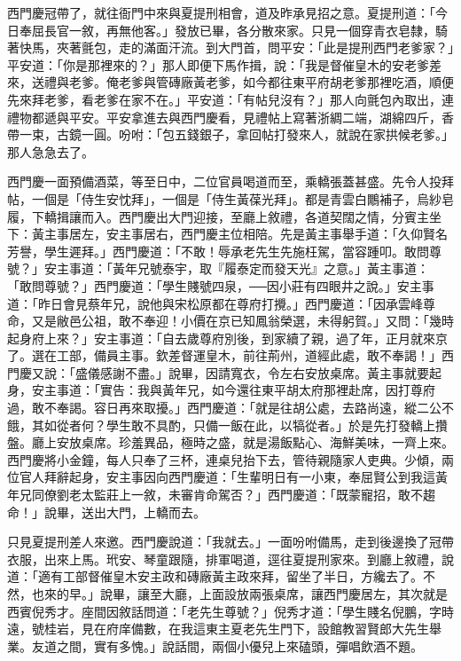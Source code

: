 西門慶冠帶了，就往衙門中來與夏提刑相會，道及昨承見招之意。夏提刑道：「今日奉屈長官一敘，再無他客。」發放已畢，各分散來家。只見一個穿青衣皂隸，騎著快馬，夾著氈包，走的滿面汗流。到大門首，問平安：「此是提刑西門老爹家？」平安道：「你是那裡來的？」那人即便下馬作揖，說：「我是督催皇木的安老爹差來，送禮與老爹。俺老爹與管磚廠黃老爹，如今都往東平府胡老爹那裡吃酒，順便先來拜老爹，看老爹在家不在。」平安道：「有帖兒沒有？」那人向氈包內取出，連禮物都遞與平安。平安拿進去與西門慶看，見禮帖上寫著浙綢二端，湖綿四斤，香帶一束，古鏡一圓。吩咐：「包五錢銀子，拿回帖打發來人，就說在家拱候老爹。」那人急急去了。

西門慶一面預備酒菜，等至日中，二位官員喝道而至，乘轎張蓋甚盛。先令人投拜帖，一個是「侍生安忱拜」，一個是「侍生黃葆光拜」。都是青雲白鷳補子，烏紗皂履，下轎揖讓而入。西門慶出大門迎接，至廳上敘禮，各道契闊之情，分賓主坐下：黃主事居左，安主事居右，西門慶主位相陪。先是黃主事舉手道：「久仰賢名芳譽，學生遲拜。」西門慶道：「不敢！辱承老先生先施枉駕，當容踵叩。敢問尊號？」安主事道：「黃年兄號泰宇，取『履泰定而發天光』之意。」黃主事道： 「敢問尊號？」西門慶道：「學生賤號四泉，──因小莊有四眼井之說。」安主事道：「昨日會見蔡年兄，說他與宋松原都在尊府打攪。」西門慶道：「因承雲峰尊命，又是敝邑公祖，敢不奉迎！小價在京已知鳳翁榮選，未得躬賀。」又問：「幾時起身府上來？」安主事道：「自去歲尊府別後，到家續了親，過了年，正月就來京了。選在工部，備員主事。欽差督運皇木，前往荊州，道經此處，敢不奉謁！」西門慶又說：「盛儀感謝不盡。」說畢，因請寬衣，令左右安放桌席。黃主事就要起身，安主事道：「實告：我與黃年兄，如今還往東平胡太府那裡赴席，因打尊府過，敢不奉謁。容日再來取擾。」西門慶道：「就是往胡公處，去路尚遠，縱二公不餓，其如從者何？學生敢不具酌，只備一飯在此，以犒從者。」於是先打發轎上攢盤。廳上安放桌席。珍羞異品，極時之盛，就是湯飯點心、海鮮美味，一齊上來。西門慶將小金鐘，每人只奉了三杯，連桌兒抬下去，管待親隨家人吏典。少傾，兩位官人拜辭起身，安主事因向西門慶道：「生輩明日有一小東，奉屈賢公到我這黃年兄同僚劉老太監莊上一敘，未審肯命駕否？」西門慶道：「既蒙寵招，敢不趨命！」說畢，送出大門，上轎而去。

只見夏提刑差人來邀。西門慶說道：「我就去。」一面吩咐備馬，走到後邊換了冠帶衣服，出來上馬。玳安、琴童跟隨，排軍喝道，逕往夏提刑家來。到廳上敘禮，說道：「適有工部督催皇木安主政和磚廠黃主政來拜，留坐了半日，方纔去了。不然，也來的早。」說畢，讓至大廳，上面設放兩張桌席，讓西門慶居左，其次就是西賓倪秀才。座間因敘話問道：「老先生尊號？」倪秀才道：「學生賤名倪鵬，字時遠，號桂岩，見在府庠備數，在我這東主夏老先生門下，設館教習賢郎大先生舉業。友道之間，實有多愧。」說話間，兩個小優兒上來磕頭，彈唱飲酒不題。

